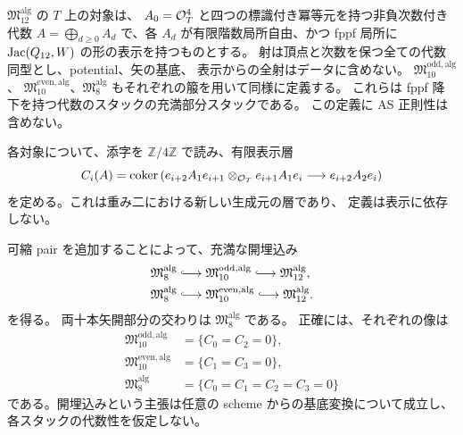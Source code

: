 \begin{definition}
\label{def:qa-algebra-stack}
$\mathfrak M_{12}^{\mathrm{alg}}$ の $T$ 上の対象は、
$A_0=\mathcal O_T^4$ と四つの標識付き冪等元を持つ非負次数付き代数
$A=\bigoplus_{d\ge0}A_d$ で、各 $A_d$ が有限階数局所自由、かつ
fppf 局所に $\operatorname{Jac}(Q_{12},W)$ の形の表示を持つものとする。
射は頂点と次数を保つ全ての代数同型とし、potential、矢の基底、
表示からの全射はデータに含めない。
$\mathfrak M_{10}^{\mathrm{odd,alg}}$、
$\mathfrak M_{10}^{\mathrm{even,alg}}$、$\mathfrak M_8^{\mathrm{alg}}$
もそれぞれの箙を用いて同様に定義する。
これらは fppf 降下を持つ代数のスタックの充満部分スタックである。
この定義に AS 正則性は含めない。
\end{definition}

各対象について、添字を $\mathbb Z/4\mathbb Z$ で読み、有限表示層
\begin{equation}
\label{eq:qa-indecomposables}
 C_i(A)=\operatorname{coker}\left(
 e_{i+2}A_1e_{i+1}\otimes_{\mathcal O_T}e_{i+1}A_1e_i
 \longrightarrow e_{i+2}A_2e_i\right)
\end{equation}
を定める。これは重み二における新しい生成元の層であり、
定義は表示に依存しない。

\begin{theorem}[矢の少ない代数スタックの開性]
\label{thm:qa-open-algebra-stacks}
可縮 pair を追加することによって、充満な開埋込み
\begin{equation}
\label{eq:qa-open-diagram}
 \begin{aligned}
 \mathfrak M_8^{\mathrm{alg}}&\lhook\joinrel\longrightarrow
 \mathfrak M_{10}^{\mathrm{odd,alg}}
 \lhook\joinrel\longrightarrow\mathfrak M_{12}^{\mathrm{alg}},\\
 \mathfrak M_8^{\mathrm{alg}}&\lhook\joinrel\longrightarrow
 \mathfrak M_{10}^{\mathrm{even,alg}}
 \lhook\joinrel\longrightarrow\mathfrak M_{12}^{\mathrm{alg}}.
 \end{aligned}
\end{equation}
を得る。
両十本矢開部分の交わりは $\mathfrak M_8^{\mathrm{alg}}$ である。
正確には、それぞれの像は
\begin{align*}
 \mathfrak M_{10}^{\mathrm{odd,alg}}&=\{C_0=C_2=0\},\\
 \mathfrak M_{10}^{\mathrm{even,alg}}&=\{C_1=C_3=0\},\\
 \mathfrak M_8^{\mathrm{alg}}&=\{C_0=C_1=C_2=C_3=0\}
\end{align*}
である。開埋込みという主張は任意の scheme からの基底変換について成立し、
各スタックの代数性を仮定しない。
\end{theorem}

